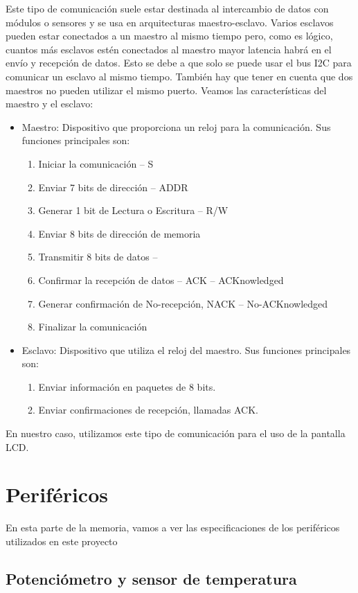 Este tipo de comunicación suele estar destinada al intercambio de datos con módulos o sensores y se usa en arquitecturas maestro-esclavo. Varios esclavos pueden estar conectados a un maestro al mismo tiempo pero, como es lógico, cuantos más esclavos estén conectados al maestro mayor latencia habrá en el envío y recepción de datos. Esto se debe a que solo se puede usar el bus I2C para comunicar un esclavo al mismo tiempo. También hay que tener en cuenta que dos maestros no pueden utilizar el mismo puerto. Veamos las características del maestro y el esclavo:
\begin{itemize}
\item Maestro: Dispositivo que proporciona un reloj para la comunicación. Sus funciones principales son:
\begin{enumerate}
\item Iniciar la comunicación – S
\item Enviar 7 bits de dirección – ADDR
\item Generar 1 bit de Lectura o Escritura – R/W
\item Enviar 8 bits de dirección de memoria
\item Transmitir 8 bits de datos –
\item Confirmar la recepción de datos – ACK – ACKnowledged
\item Generar confirmación de No-recepción, NACK – No-ACKnowledged
\item Finalizar la comunicación
\end{enumerate}
\item Esclavo: Dispositivo que utiliza el reloj del maestro. Sus funciones principales son:
\begin{enumerate}
\item Enviar información en paquetes de 8 bits.
\item Enviar confirmaciones de recepción, llamadas ACK.
\end{enumerate}
\end{itemize}
En nuestro caso, utilizamos este tipo de comunicación para el uso de la pantalla LCD.



\section{Periféricos}\label{sec:perifericos}
En esta parte de la memoria, vamos a ver las especificaciones de los periféricos utilizados en este proyecto

\subsection{Potenciómetro y sensor de temperatura} \label{potenySensorTemp}

